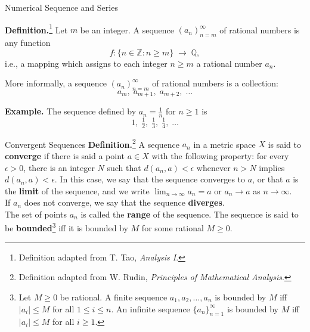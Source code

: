 \documentclass{beamer}
\begin{document}
\begin{frame}{Numerical Sequence and Series}

\textbf{Definition.}\footnote{Definition adapted from T. Tao, \emph{Analysis
I}.} Let $m$ be an integer.  
A sequence $(a_n)_{n=m}^{\infty}$ of rational numbers is any function
\[
f: \{ n \in \mathbb{Z} : n \geq m \} \;\to\; \mathbb{Q},
\]
i.e., a mapping which assigns to each integer $n \geq m$ a rational number
$a_n$.

\medskip
More informally, a sequence $(a_n)_{n=m}^{\infty}$ of rational numbers is a
collection:
\[
a_m, \; a_{m+1}, \; a_{m+2}, \; \dots
\]

\bigskip
\textbf{Example.}  
The sequence defined by $a_n = \tfrac{1}{n}$ for $n \geq 1$ is
\[
1, \; \tfrac{1}{2}, \; \tfrac{1}{3}, \; \tfrac{1}{4}, \; \dots
\]

    
\end{frame}

\begin{frame}{Convergent Sequences}
\textbf{Definition.}\footnote{Definition adapted from W. Rudin, \emph{Principles
of Mathematical Analysis}.} A sequence ${a_n}$ in a metric space $X$ is said to
\textbf{converge} if there is said a point $a \in X$ with the following
property: for every $\epsilon > 0$, there is an integer $N$ such that $d(a_n, a)
< \epsilon$ whenever $n > N$ implies $d(a_n,a)< \epsilon$.  In this case, we say
that the sequence converges to $a$, or that $a$ is the \textbf{limit} of the
sequence, and we write $\lim_{n \to \infty} a_n = a$ or $a_n \to a$ as $n \to
\infty$.\\ 
If ${a_n}$ does not converge, we say that the sequence \textbf{diverges}.\\ 

The set of points $a_n$ is called the \textbf{range} of the sequence. The
sequence is said to be \textbf{bounded}\footnote{Let $M \geq 0$ be rational.  A
finite sequence $a_1, a_2, \dotsc, a_n$ is bounded by $M$ iff $|a_i| \leq M$ for
all $1 \leq i \leq n$. An infinite sequence $\{a_n\}_{n=1}^{\infty}$ is bounded
by $M$ iff $|a_i| \leq M$ for all $i \geq 1$. } iff it is bounded by $M$
for some rational $M \geq 0$. 
\end{frame}
\end{document}
